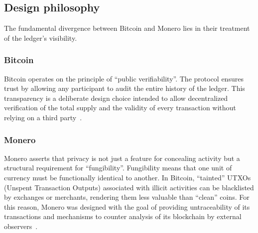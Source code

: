 \documentclass[conference]{IEEEtran}
\begin{document}
\subsection{Design philosophy}
The fundamental divergence between Bitcoin and Monero lies in their treatment of the ledger's visibility.

\subsubsection{Bitcoin}
Bitcoin operates on the principle of ``public verifiability''. The protocol ensures trust by allowing any participant to audit the entire history of the ledger. This transparency is a deliberate design choice intended to allow decentralized verification of the total supply and the validity of every transaction without relying on a third party~\cite{monero_vs_bitcoin_oak_research}.

\subsubsection{Monero}
Monero asserts that privacy is not just a feature for concealing activity but a structural requirement for ``fungibility''. Fungibility means that one unit of currency must be functionally identical to another. In Bitcoin, ``tainted'' UTXOs (Unspent Transaction Outputs) associated with illicit activities can be blacklisted by exchanges or merchants, rendering them less valuable than ``clean'' coins. For this reason, Monero was designed with the goal of providing untraceability of its transactions and mechanisms to counter analysis of its blockchain by external observers~\cite{monero_vs_bitcoin_oak_research}.
\end{document}
